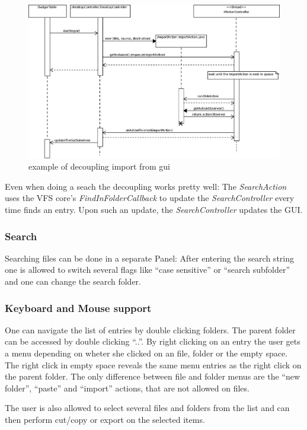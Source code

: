 \begin{figure}[h!]
\centering
\includegraphics[width=1\textwidth]{figures/single_threaded_access.eps}
\caption{example of decoupling import from gui}
\label{fig:decouple_threads}
\end{figure}

Even when doing a seach the decoupling works pretty well: The
\textit{SearchAction} uses the VFS core's \textit{FindInFolderCallback} to
update the \textit{SearchController} every time finds an entry. Upon such an
update, the \textit{SearchController} updates the GUI.

\subsubsection{Search}
Searching files can be done in a separate Panel: After entering the search
string one is allowed to switch several flags like ``case sensitive'' or
``search subfolder'' and one can change the search folder.


\subsubsection{Keyboard and Mouse support}
One can navigate the list of entries by double clicking folders. The parent
folder can be accessed by double clicking ``..''. By right clicking on an entry
the user gets a menu depending on wheter she clicked on an file, folder or the empty
space. The right click in empty space reveals the same menu entries as the right
click on the parent folder. The only difference between file and folder menus
are the ``new folder'', ``paste'' and ``import'' actions, that are not allowed
on files.

The user is also allowed to select several files and folders from the list and
can then perform cut/copy or export on the selected items. 



